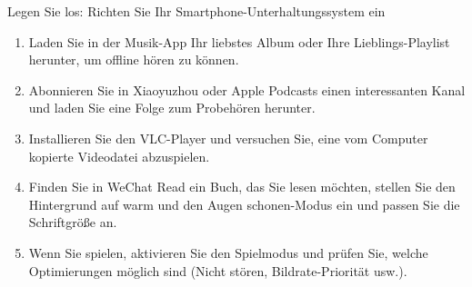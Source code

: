 \begin{tcbpractice}{Legen Sie los: Richten Sie Ihr Smartphone-Unterhaltungssystem ein}
\begin{enumerate}
  \item Laden Sie in der Musik-App Ihr liebstes Album oder Ihre Lieblings-Playlist herunter, um offline hören zu können.
  \item Abonnieren Sie in Xiaoyuzhou oder Apple Podcasts einen interessanten Kanal und laden Sie eine Folge zum Probehören herunter.
  \item Installieren Sie den VLC-Player und versuchen Sie, eine vom Computer kopierte Videodatei abzuspielen.
  \item Finden Sie in WeChat Read ein Buch, das Sie lesen möchten, stellen Sie den Hintergrund auf warm und den Augen schonen-Modus ein und passen Sie die Schriftgröße an.
  \item Wenn Sie spielen, aktivieren Sie den Spielmodus und prüfen Sie, welche Optimierungen möglich sind (Nicht stören, Bildrate-Priorität usw.).
\end{enumerate}

\end{tcbpractice}
